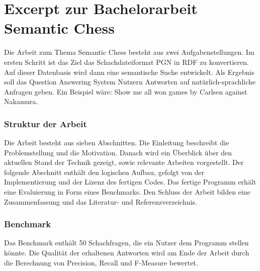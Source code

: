 \documentclass[12pt]{scrreprt}
\begin{document}
\section*{Excerpt zur Bachelorarbeit \glqq Semantic Chess\grqq}

Die Arbeit zum Thema \glqq Semantic Chess\grqq{} besteht aus zwei Aufgabenstellungen. Im ersten Schritt ist das Ziel das Schachdateiformat PGN in RDF zu konvertieren. Auf dieser Datenbasis wird dann eine semantische Suche entwickelt. Als Ergebnis soll das Question Answering System Nutzern Antworten auf natürlich-sprachliche Anfragen geben. Ein Beispiel wäre: \glqq Show me all won \newline games by Carlsen against Nakamura\grqq.

\subsubsection*{Struktur der Arbeit}
Die Arbeit besteht aus sieben Abschnitten. Die Einleitung beschreibt die Problemstellung und die Motivation. Danach wird ein Überblick über den aktuellen Stand der Technik gezeigt, sowie relevante Arbeiten vorgestellt. Der folgende Abschnitt enthält den logischen Aufbau, gefolgt von der Implementierung und der Lizenz des fertigen Codes. Das fertige Programm erhält eine Evaluierung in Form eines Benchmarks. Den Schluss der Arbeit bilden eine Zusammenfassung und das Literatur- und Referenzverzeichnis.

\subsubsection*{Benchmark}	
Das Benchmark enthält 50 Schachfragen, die ein Nutzer dem Programm stellen könnte. Die Qualität der erhaltenen Antworten wird am Ende der Arbeit durch die Berechnung von Precision, Recall und F-Measure bewertet.
\end{document}
